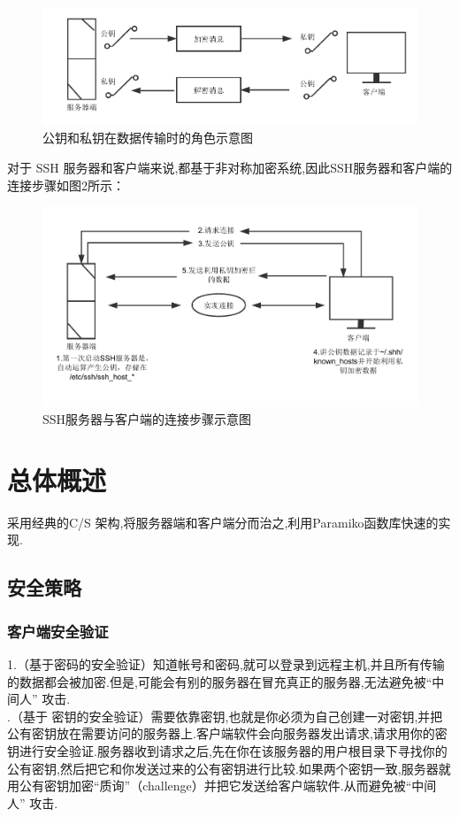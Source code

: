 \documentclass[UTF8,nofonts,a4paper]{ctexart}
\begin{document}
\begin{figure}[htbp]
\centering
\includegraphics[scale = 0.7]{1-1.pdf}
\caption{公钥和私钥在数据传输时的角色示意图}
\end{figure}

\indent 对于 SSH 服务器和客户端来说,都基于非对称加密系统,因此SSH服务器和客户端的连接步骤如图2所示：
\begin{figure}[htbp]
\centering
\includegraphics[scale = 0.7]{ssh.pdf}
\caption{SSH服务器与客户端的连接步骤示意图}
\end{figure}
\newpage
\section{总体概述}
采用经典的C/S 架构,将服务器端和客户端分而治之,利用Paramiko函数库快速的实现.
\subsection{安全策略}
\subsubsection{客户端安全验证}
1.（基于密码的安全验证）知道帐号和密码,就可以登录到远程主机,并且所有传输的数据都会被加密.但是,可能会有别的服务器在冒充真正的服务器,无法避免被“中间人” 攻击.\\
.（基于
密钥的安全验证）需要依靠密钥,也就是你必须为自己创建一对密钥,并把公有密钥放在需要访问的服务器上.客户端软件会向服务器发出请求,请求用你的密钥进行安全验证.服务器收到请求之后,先在你在该服务器的用户根目录下寻找你的公有密钥,然后把它和你发送过来的公有密钥进行比较.如果两个密钥一致,服务器就用公有密钥加密“质询”（challenge）并把它发送给客户端软件.从而避免被“中间人” 攻击.
\end{document}
